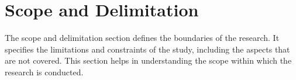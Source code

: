 \section{Scope and Delimitation}
	The scope and delimitation section defines the boundaries of the research. It specifies the limitations and constraints of the study, including the aspects that are not covered. This section helps in understanding the scope within which the research is conducted.